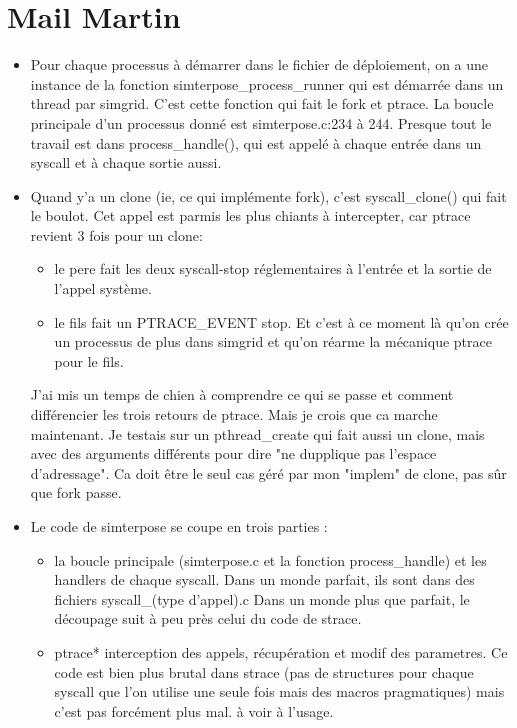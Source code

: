 \documentclass{article}
\begin{document}
\section{Mail Martin}
\begin{itemize}
\item Pour chaque processus à démarrer dans le fichier de déploiement,
  on a une instance de la fonction simterpose\_process\_runner qui est
  démarrée dans un thread par simgrid. C'est cette fonction qui fait
  le fork et ptrace. La boucle principale d'un processus donné est
  simterpose.c:234 à 244. Presque tout le travail est dans
  process\_handle(), qui est appelé à chaque entrée dans un syscall et
  à chaque sortie aussi.
  
\item Quand y'a un clone (ie, ce qui implémente fork), c'est
  syscall\_clone() qui fait le boulot. Cet appel est parmis les plus
  chiants à intercepter, car ptrace revient 3 fois pour un clone:
  
\begin{itemize}
  \item le pere fait les deux syscall-stop réglementaires à l'entrée
    et la sortie de l'appel système.
  \item le fils fait un PTRACE\_EVENT stop. Et c'est à ce moment là
    qu'on crée un processus de plus dans simgrid et qu'on réarme la
    mécanique ptrace pour le fils.
\end{itemize}    
  J'ai mis un temps de chien à comprendre ce qui se passe et comment
  différencier les trois retours de ptrace. Mais je crois que ca
  marche maintenant. Je testais sur un pthread\_create qui fait aussi
  un clone, mais avec des arguments différents pour dire "ne dupplique
  pas l'espace d'adressage". Ca doit être le seul cas géré par mon
  "implem" de clone, pas sûr que fork passe.

\item Le code de simterpose se coupe en trois parties :

\begin{itemize}
  \item la boucle principale (simterpose.c et la fonction
    process\_handle) et les handlers de chaque syscall. Dans un monde
    parfait, ils sont dans des fichiers syscall\_(type d'appel).c Dans
    un monde plus que parfait, le découpage suit à peu près celui du
    code de strace.
  
  \item ptrace* interception des appels, récupération et modif des
    parametres. Ce code est bien plus brutal dans strace (pas de
    structures pour chaque syscall que l'on utilise une seule fois
    mais des macros pragmatiques) mais c'est pas forcément plus mal. à
    voir à l'usage.
    

\end{itemize}
\end{itemize}
\end{document}
